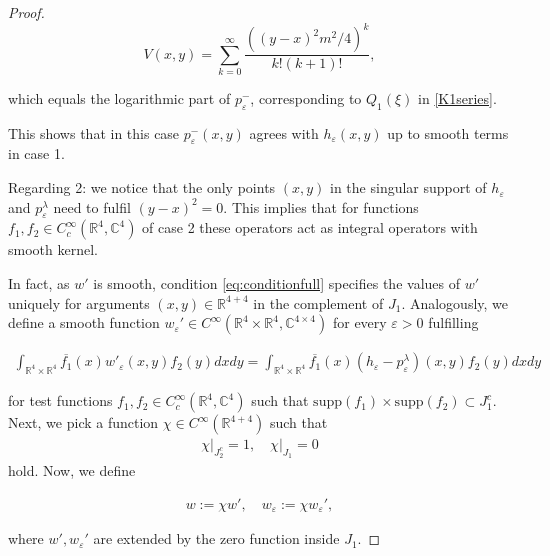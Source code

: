 \documentclass[b5paper,draft,openbib,12pt]{memoir}
\begin{document}
\begin{proof}
\begin{equation}
V(x,y)=\sum_{k=0}^\infty \frac{( (y-x)^2m^2/4)^k}{k! (k+1)!},
\end{equation}

which equals the logarithmic part of \(p^-_\varepsilon\), corresponding to \(Q_1(\xi)\) in \eqref{K1series}. 

This shows that in this case
\(p_\varepsilon^-(x,y)\) agrees with \(h_\varepsilon(x,y)\) up to smooth terms in case 1.
  
Regarding 2: we notice that the only points \((x,y)\) in 
the singular support of \(h_\varepsilon\) and 
\(p_\varepsilon^{\lambda}\) need to fulfil
\((y-x)^2=0\). This implies that for functions 
\(f_1,f_2\in C_c^\infty(\mathbb{R}^4,\mathbb{C}^4)\) 
of case 2 these operators act as 
integral operators with smooth kernel.


In fact, as \(w'\) is smooth, condition \eqref{eq:conditionfull} specifies the values of \(w'\)
uniquely for arguments \((x,y)\in\mathbb{R}^{4+4}\) in the complement of \(J_1\).
Analogously, we define a smooth function \(w_\varepsilon' \in C^\infty(\mathbb{R}^4\times\mathbb{R}^4,\mathbb{C}^{4\times 4})\) for
every \(\varepsilon>0\) fulfilling 

\begin{align}\label{eq:wepsilon_condition}
\int_{\mathbb{R}^4\times\mathbb{R}^4} \overline{f_1}(x) w'_\varepsilon(x,y) f_2(y)dxdy =
\int_{\mathbb{R}^4\times\mathbb{R}^4} \overline{f_1}(x) (h_\varepsilon - p_\varepsilon^\lambda)(x,y) f_2(y)dxdy
\end{align}

for test functions 
\(f_1,f_2\in C^\infty_c(\mathbb{R}^4,\mathbb{C}^4)\) such 
that \(\mathrm{supp}(f_1)\times \mathrm{supp}(f_2)\subset J_1^c\).
Next, we pick a function \(\chi\in C^\infty(\mathbb{R}^{4+4})\) such that 
\begin{align}
\left.\chi \right|_{J_2^c}=1, \quad \left. \chi \right|_{J_1}=0
\end{align}
hold. Now, we define

\begin{align}
w:=\chi w',\quad w_\varepsilon:= \chi w_\varepsilon',
\end{align}

where \(w',w_{\varepsilon}'\) are extended by the zero function inside \(J_1\).


\end{proof}
\end{document}
